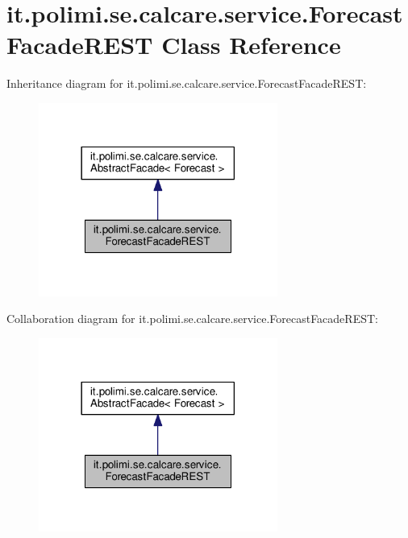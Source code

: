 \hypertarget{classit_1_1polimi_1_1se_1_1calcare_1_1service_1_1ForecastFacadeREST}{}\section{it.\+polimi.\+se.\+calcare.\+service.\+Forecast\+Facade\+R\+E\+S\+T Class Reference}
\label{classit_1_1polimi_1_1se_1_1calcare_1_1service_1_1ForecastFacadeREST}


Inheritance diagram for it.\+polimi.\+se.\+calcare.\+service.\+Forecast\+Facade\+R\+E\+S\+T\+:
\nopagebreak
\begin{figure}[H]
\begin{center}
\leavevmode
\includegraphics[width=222pt]{classit_1_1polimi_1_1se_1_1calcare_1_1service_1_1ForecastFacadeREST__inherit__graph}
\end{center}
\end{figure}


Collaboration diagram for it.\+polimi.\+se.\+calcare.\+service.\+Forecast\+Facade\+R\+E\+S\+T\+:
\nopagebreak
\begin{figure}[H]
\begin{center}
\leavevmode
\includegraphics[width=222pt]{classit_1_1polimi_1_1se_1_1calcare_1_1service_1_1ForecastFacadeREST__coll__graph}
\end{center}
\end{figure}
